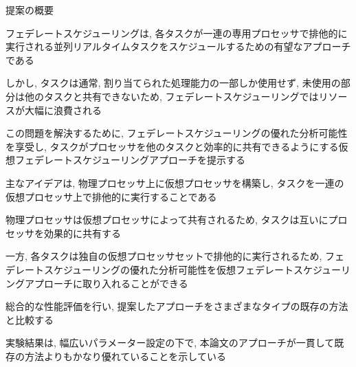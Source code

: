 
\begin{frame}{提案の概要}
    \item フェデレートスケジューリングは, 各タスクが一連の専用プロセッサで排他的に実行される並列リアルタイムタスクをスケジュールするための有望なアプローチである
    \item しかし, タスクは通常, 割り当てられた処理能力の一部しか使用せず, 未使用の部分は他のタスクと共有できないため, フェデレートスケジューリングではリソースが大幅に浪費される
    \item この問題を解決するために, フェデレートスケジューリングの優れた分析可能性を享受し, タスクがプロセッサを他のタスクと効率的に共有できるようにする仮想フェデレートスケジューリングアプローチを提示する
    \item 主なアイデアは, 物理プロセッサ上に仮想プロセッサを構築し, タスクを一連の仮想プロセッサ上で排他的に実行することである
    \item 物理プロセッサは仮想プロセッサによって共有されるため, タスクは互いにプロセッサを効果的に共有する
    \item 一方, 各タスクは独自の仮想プロセッサセットで排他的に実行されるため, フェデレートスケジューリングの優れた分析可能性を仮想フェデレートスケジューリングアプローチに取り入れることができる
    \item 総合的な性能評価を行い, 提案したアプローチをさまざまなタイプの既存の方法と比較する
    \item 実験結果は, 幅広いパラメーター設定の下で, 本論文のアプローチが一貫して既存の方法よりもかなり優れていることを示している
\end{frame}
